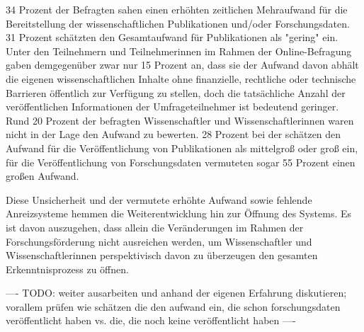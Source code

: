 34 Prozent der Befragten sahen einen erhöhten zeitlichen Mehraufwand für die Bereitstellung der wissenschaftlichen Publikationen und/oder Forschungsdaten. 31 Prozent schätzten den Gesamtaufwand für Publikationen als "gering" ein. Unter den Teilnehmern und Teilnehmerinnen im Rahmen der Online-Befragung gaben demgegenüber zwar nur 15 Prozent an, dass sie der Aufwand davon abhält die eigenen wissenschaftlichen Inhalte ohne finanzielle, rechtliche oder technische Barrieren öffentlich zur Verfügung zu stellen, doch die tatsächliche Anzahl der veröffentlichen Informationen der Umfrageteilnehmer ist bedeutend geringer. Rund 20 Prozent der befragten Wissenschaftler und Wissenschaftlerinnen waren nicht in der Lage den Aufwand zu bewerten. 28 Prozent bei der schätzen den Aufwand für die Veröffentlichung von Publikationen als mittelgroß oder groß ein, für die Veröffentlichung von Forschungsdaten vermuteten sogar 55 Prozent einen großen Aufwand.

Diese Unsicherheit und der vermutete erhöhte Aufwand sowie fehlende Anreizsysteme hemmen die Weiterentwicklung hin zur Öffnung des Systems. Es ist davon auszugehen, dass allein die Veränderungen im Rahmen der Forschungsförderung nicht ausreichen werden, um Wissenschaftler und Wissenschaftlerinnen perspektivisch davon zu überzeugen den gesamten Erkenntnisprozess zu öffnen.

---- TODO: weiter ausarbeiten und anhand der eigenen Erfahrung diskutieren; vorallem prüfen wie schätzen die den aufwand ein, die schon forschungsdaten veröffentlicht haben vs. die, die noch keine veröffentlicht haben ----
